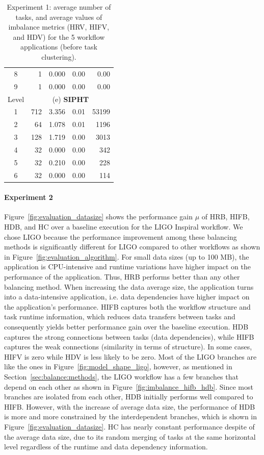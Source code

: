 \begin{table}[!htb]
\begin{tabular}{c|r|r|r|r}
		8 &1 & 0.000 & 0.00 & 0.00 \\
		9 & 1 & 0.000 & 0.00 & 0.00 \\
		\hline		
		Level & \multicolumn{4}{c}{(e) \textbf{SIPHT}} \\
		\hline
		1 & 712 & 3.356 & 0.01 & 53199 \\
		2 & 64 & 1.078 & 0.01 & 1196 \\
		3 & 128 & 1.719 & 0.00 & 3013 \\
		4 & 32 & 0.000 & 0.00 & 342 \\
		5 & 32 & 0.210 & 0.00 & 228\\
		6& 32 & 0.000 & 0.00 & 114\\
	\end{tabular}
	\caption{Experiment 1: average number of tasks, and average values of imbalance metrics (HRV, HIFV, and HDV) for the 5 workflow applications (before task clustering).}
	\label{tab:evaluation_montage}
\end{table} 


\paragraph{\textbf{Experiment 2}} 
Figure~\ref{fig:evaluation_datasize} shows the performance gain $\mu$ of HRB, HIFB, HDB, and HC over a baseline execution for the LIGO Inspiral workflow. We chose LIGO because the performance improvement among these balancing methods is significantly different for LIGO compared to other workflows as shown in Figure~\ref{fig:evaluation_algorithm}. For small data sizes (up to 100 MB), the application is CPU-intensive and runtime variations have higher impact on the performance of the application. Thus, HRB performs better than any other balancing method. When increasing the data average size, the application turns into a data-intensive application, i.e. data dependencies have higher impact on the application's performance. HIFB captures both the workflow structure and task runtime information, which reduces data transfers between tasks and consequently yields better performance gain over the baseline execution. HDB captures the strong connections between tasks (data dependencies), while HIFB captures the weak connections (similarity in terms of structure). In some cases, HIFV is zero while HDV is less likely to be zero.
Most of the LIGO branches are like the ones in Figure~\ref{fig:model_shape_ligo}, however, as mentioned in Section~\ref{sec:balance:methods}, the LIGO workflow has a few branches that depend on each other as shown in Figure~\ref{fig:imbalance_hifb_hdb}. Since most branches are isolated from each other, HDB initially performs well compared to HIFB. However, with the increase of average data size, the performance of HDB is more and more constrained by the interdependent branches, which is shown in Figure~\ref{fig:evaluation_datasize}.  
HC has nearly constant performance despite of the average data size, due to its random merging of tasks at the same horizontal level regardless of the runtime and data dependency information.

